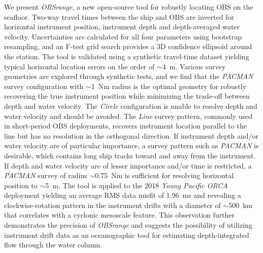 We present \textit{OBSrange}, a new open-source tool for robustly locating OBS on the seafloor. Two-way travel times between the ship and OBS are inverted for horizontal instrument position, instrument depth and depth-averaged water velocity. Uncertainties are calculated for all four parameters using bootstrap resampling, and an F-test grid search provides a 3D confidence ellipsoid around the station. The tool is validated using a synthetic travel-time dataset yielding typical horizontal location errors on the order of $\sim$4~m. Various survey geometries are explored through synthetic tests, and we find that the \textit{PACMAN} survey configuration with $\sim$1~Nm radius is the optimal geometry for robustly recovering the true instrument position while minimizing the trade-off between depth and water velocity. The \textit{Circle} configuration is unable to resolve depth and water velocity and should be avoided. The \textit{Line} survey pattern, commonly used in short-period OBS deployments, recovers instrument location parallel to the line but has no resolution in the orthogonal direction. If instrument depth and/or water velocity are of particular importance, a survey pattern such as \textit{PACMAN} is desirable, which contains long ship tracks toward and away from the instrument. If depth and water velocity are of lesser importance and/or time is restricted, a \textit{PACMAN} survey of radius $\sim$0.75~Nm is sufficient for resolving horizontal position to $\sim$5~m. The tool is applied to the 2018 \textit{Young Pacific ORCA} deployment yielding an average RMS data misfit of 1.96~ms and revealing a clockwise-rotation pattern in the instrument drifts with a diameter of $\sim$500~km that correlates with a cyclonic mesoscale feature. This observation further demonstrates the precision of \textit{OBSrange} and suggests the possibility of utilizing instrument drift data as an oceanographic tool for estimating depth-integrated flow through the water column.



